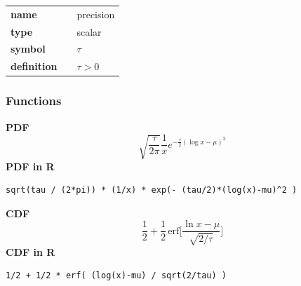 \noindent\begin{tabular}{p{2cm}cl}
\textbf{name} & & precision \\
\textbf{type} & & scalar \\
\textbf{symbol} & & $\tau$  \\
\textbf{definition} & & $\tau > 0$
\end{tabular}
\subsubsection*{Functions}

\smallskip \noindent \hspace{.2cm} \textbf{PDF} 
\begin{equation*}\sqrt{\frac{\tau}{2 \pi}} \frac{1}{x}e^{-\frac{\tau}{2}(\log x-\mu)^2}\end{equation*}
\smallskip \noindent \hspace{.2cm} \textbf{PDF in R}  
\begin{verbatim}sqrt(tau / (2*pi)) * (1/x) * exp(- (tau/2)*(log(x)-mu)^2 )\end{verbatim}
\smallskip \noindent \hspace{.2cm} \textbf{CDF} 
\begin{equation*}\frac12 + \frac12\,\text{erf}\Big[\frac{\ln x-\mu}{\sqrt{2/\tau}}\Big]\end{equation*}
\smallskip \noindent \hspace{.2cm} \textbf{CDF in R} 
\begin{verbatim}1/2 + 1/2 * erf( (log(x)-mu) / sqrt(2/tau) )\end{verbatim}
\smallskip
